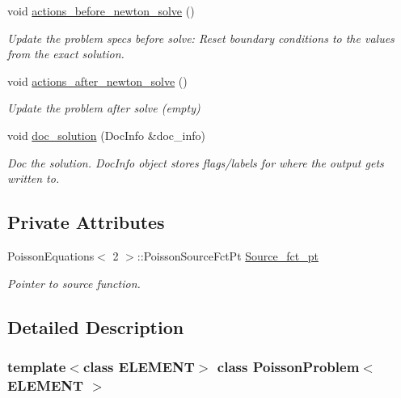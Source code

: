 \begin{DoxyCompactItemize}
void \hyperlink{classPoissonProblem_a398608a5ff73b74c5a387b3f794c58df}{actions\+\_\+before\+\_\+newton\+\_\+solve} ()
\begin{DoxyCompactList}\small\item\em Update the problem specs before solve\+: Reset boundary conditions to the values from the exact solution. \end{DoxyCompactList}\item 
void \hyperlink{classPoissonProblem_a7a9478d8e1e5c7d3a886b00ab7d50bbd}{actions\+\_\+after\+\_\+newton\+\_\+solve} ()
\begin{DoxyCompactList}\small\item\em Update the problem after solve (empty) \end{DoxyCompactList}\item 
void \hyperlink{classPoissonProblem_aab6f503fa242f687bb8452527bb7688f}{doc\+\_\+solution} (Doc\+Info \&doc\+\_\+info)
\begin{DoxyCompactList}\small\item\em Doc the solution. Doc\+Info object stores flags/labels for where the output gets written to. \end{DoxyCompactList}\end{DoxyCompactItemize}
\subsection*{Private Attributes}
\begin{DoxyCompactItemize}
\item 
Poisson\+Equations$<$ 2 $>$\+::Poisson\+Source\+Fct\+Pt \hyperlink{classPoissonProblem_a2ba5bb705abab012b72bbd7f4016d5fe}{Source\+\_\+fct\+\_\+pt}
\begin{DoxyCompactList}\small\item\em Pointer to source function. \end{DoxyCompactList}\end{DoxyCompactItemize}


\subsection{Detailed Description}
\subsubsection*{template$<$class E\+L\+E\+M\+E\+NT$>$\newline
class Poisson\+Problem$<$ E\+L\+E\+M\+E\+N\+T $>$}

